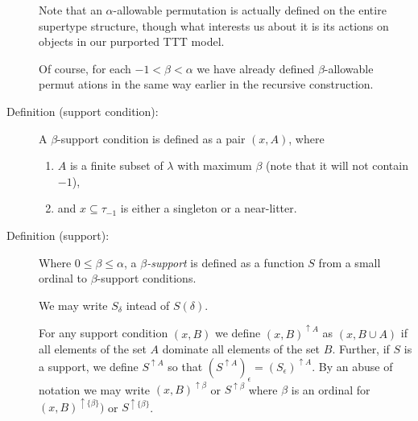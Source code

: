 \documentclass[112pt]{article}
\begin{document}
\begin{description}
Note that an $\alpha$-allowable permutation is actually defined on the entire supertype structure, though what interests us about it is its actions on objects in our purported TTT model.

Of course, for each $-1<\beta<\alpha$ we have already defined $\beta$-allowable permut
ations in the same way earlier in the recursive construction.




\item[Definition (support condition):]  A $\beta$-support condition is defined as a pair $(x,A)$, where 
\begin{enumerate}

\item $A$ is a finite subset of $\lambda$  with maximum $\beta$ (note that it will not contain $-1$), 

\item and $x\subseteq \tau_{-1}$ is either a singleton or a near-litter.

\end{enumerate}

\item[Definition (support):]  Where $0\leq\beta \leq \alpha$, a {\em $\beta$-support\/} is defined as a function $S$ from a small ordinal to $\beta$-support conditions.

   We may write $S_\delta$ intead of $S(\delta)$.

For any support condition $(x,B)$ we define $(x,B)^{\uparrow A}$ as $(x,B\cup A)$ if all elements of the set $A$ dominate all elements of the set $B$.
Further, if $S$ is a support, we define $S^{\uparrow A}$ so that $(S^{\uparrow A})_\epsilon = (S_\epsilon)^{\uparrow A}$.  By an abuse of notation we may write $(x,B)^{\uparrow \beta}$ or $S^{\uparrow \beta}$ where $\beta$ is an ordinal for $(x,B)^{\uparrow \{\beta\}})$ or $S^{\uparrow \{\beta\}}$.

\begin{comment}

We make the formal requirement on supports
that if the range of a support contains $(x,A)$ and $(y,A)$ where $x,y$ are typed near-litters and either $(x \Delta y)\cap \tau_{-1}$ or $(x \cap y) \cap \tau_{-1}$ is small, that all $(z,A)$ with $z\cap \tau_{-1}$ a singleton subset of this small set are included in the range of the support.

For any supports $S$ and $T$ we denote by $S+T$ a support which consists
of $S$, followed by $T$, followed by the atoms which need to be added to make this a support (to make it satisfy the additional condition):  what this means is that $(S+T)_\epsilon = S(\epsilon)$ [which we write $S_\epsilon$] for $\epsilon$ in the domain of $S$, $(S+T)_{{\tt dom}(S)+\epsilon} = T_\epsilon$ for $\epsilon$ in the domain of $T$, and the rest of the range of $S+T$ consists of the support conditions with atomic first component  which must be added to satisfy the additional condition [this is not uniquely determined:  supports usually have many possible sums because the needed additional conditions can be added in any order.]
\end{comment}


\end{description}
\end{document}
